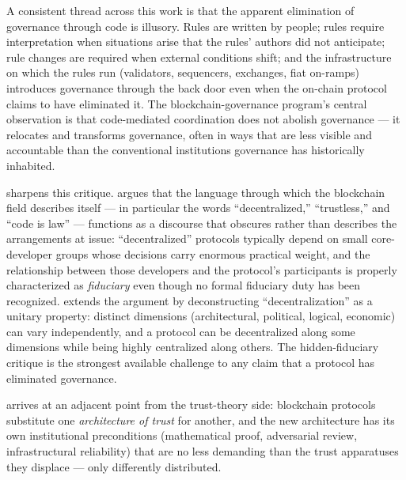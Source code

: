 \documentclass[11pt,a4paper]{article}
\theoremstyle{remark}
\begin{document}
A consistent thread across this work is that the apparent
elimination of governance through code is illusory. Rules are
written by people; rules require interpretation when situations
arise that the rules' authors did not anticipate; rule changes
are required when external conditions shift; and the
infrastructure on which the rules run (validators, sequencers,
exchanges, fiat on-ramps) introduces governance through the back
door even when the on-chain protocol claims to have eliminated
it. The blockchain-governance program's central observation is
that code-mediated coordination does not abolish governance --- it
relocates and transforms governance, often in ways that are less
visible and accountable than the conventional institutions
governance has historically inhabited.

\citet{walch2017path, walch2019deconstructing} sharpens this
critique. \citeauthor{walch2017path} argues that the language
through which the blockchain field describes itself --- in
particular the words ``decentralized,'' ``trustless,'' and ``code
is law'' --- functions as a discourse that obscures rather than
describes the arrangements at issue: ``decentralized'' protocols
typically depend on small core-developer groups whose decisions
carry enormous practical weight, and the relationship between
those developers and the protocol's participants is properly
characterized as \emph{fiduciary} even though no formal fiduciary
duty has been recognized.
\citeauthor{walch2019deconstructing} extends the argument by
deconstructing ``decentralization'' as a unitary property:
distinct dimensions (architectural, political, logical, economic)
can vary independently, and a protocol can be decentralized along
some dimensions while being highly centralized along others. The
hidden-fiduciary critique is the strongest available challenge to
any claim that a protocol has eliminated governance.

\citet{werbach2018blockchain} arrives at an adjacent point from
the trust-theory side: blockchain protocols substitute one
\emph{architecture of trust} for another, and the new architecture
has its own institutional preconditions (mathematical proof,
adversarial review, infrastructural reliability) that are no less
demanding than the trust apparatuses they displace --- only
differently distributed.
\end{document}
